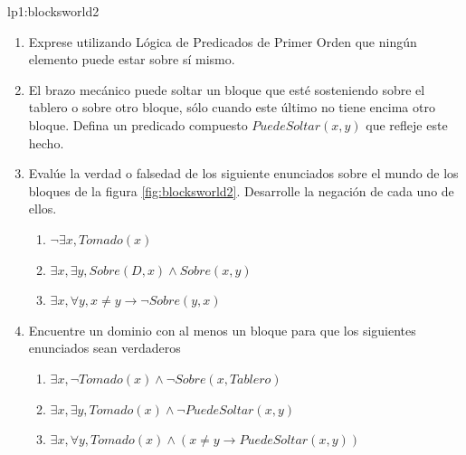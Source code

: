 \begin{defproblem}{lp1:blocksworld2}
\begin{onlyproblem}
		\begin{enumerate}
			\item Exprese utilizando Lógica de Predicados de Primer Orden que ningún elemento puede estar sobre sí mismo.
			\item El brazo mecánico puede soltar un bloque que esté sosteniendo sobre el tablero o sobre otro bloque, sólo cuando este último no tiene encima otro bloque. Defina un predicado compuesto $ PuedeSoltar(x,y) $ que refleje este hecho.
			\item Evalúe la verdad o falsedad de los siguiente enunciados sobre el mundo de los bloques de la figura \ref{fig:blocksworld2}. Desarrolle la negación de cada uno de ellos.
			\begin{enumerate}
				\item $ \neg \exists x, Tomado(x)  $
				\item $ \exists x, \exists y, Sobre(D,x) \land Sobre(x,y) $
				\item $ \exists x, \forall y, x \neq y \rightarrow \neg Sobre(y, x) $
			\end{enumerate}
			\item Encuentre un dominio con al menos un bloque para que los siguientes enunciados sean verdaderos
			\begin{enumerate}
				\item $ \exists x, \neg Tomado(x) \land \neg Sobre(x, Tablero) $
				\item $ \exists x, \exists y, Tomado(x) \land \neg PuedeSoltar(x,y) $
				\item $ \exists x, \forall y, Tomado(x) \land (x \neq y \rightarrow PuedeSoltar(x,y)) $
			\end{enumerate}
		\end{enumerate}
	

\end{onlyproblem}
\end{defproblem}
